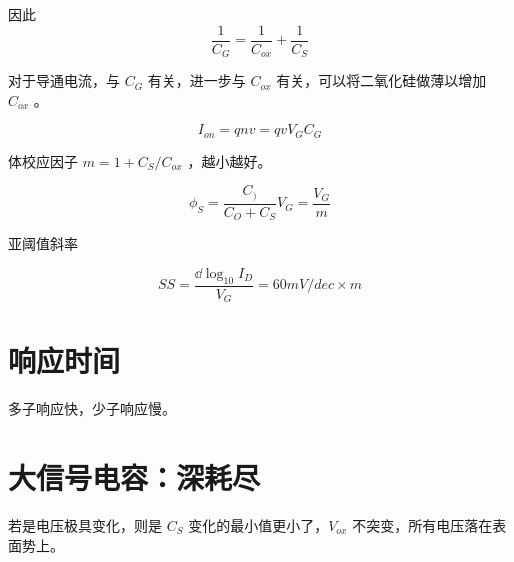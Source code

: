 \documentclass[cn,11pt,chinese,black,simple]{../elegantbook}
\begin{document}
因此 \[\frac{1}{C_G} = \frac{1}{C_{ox}} + \frac{1}{C_S}\]

对于导通电流，与 \(C_G\) 有关，进一步与 \(C_{ox}\) 有关，可以将二氧化硅做薄以增加 \(C_{ox}\) 。

\[I_{on} = q n v = q v V_G C_G \] 

体校应因子 \(m = 1 + C_S / C_{ox}\) ，越小越好。

\[\phi_S = \frac{C_)}{C_O + C_S}V_G = \frac{V_G}{m}\]

亚阈值斜率 

\[SS = \frac{\dd{\log _{10} I_D}}{V_G} = 60 mV/dec \times m\]


\section{响应时间}

多子响应快，少子响应慢。

\section{大信号电容：深耗尽}

若是电压极具变化，则是 \(C_S\) 变化的最小值更小了，\(V_{ox}\) 不突变，所有电压落在表面势上。


\let\chapname\undefined
\ifx\mainclass\undefined
\end{document}
